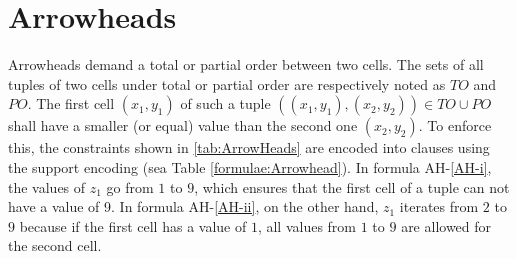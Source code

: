 \clearpage

\section{Arrowheads}\label{Encoding:Arrowheads}
Arrowheads demand a total or partial order between two cells. The sets of all tuples of two cells under total or partial order are respectively noted as $TO$ and $PO$. The first cell $(x_1,y_1)$ of such a tuple  $((x_1,y_1), (x_2,y_2)) \in TO \cup PO$ shall have a smaller (or equal) value than the second one $(x_2,y_2)$. To enforce this, the constraints shown in \ref{tab:ArrowHeads} are encoded into clauses using the support encoding (sea Table \ref{formulae:Arrowhead}). In formula AH-\ref{AH-i}, the values of $z_1$ go from $1$ to $9$, which ensures that the first cell of a tuple can not have a value of 9. In formula AH-\ref{AH-ii}, on the other hand, $z_1$ iterates from $2$ to $9$ because if the first cell has a value of $1$, all values from $1$ to $9$ are allowed for the second cell.\\

